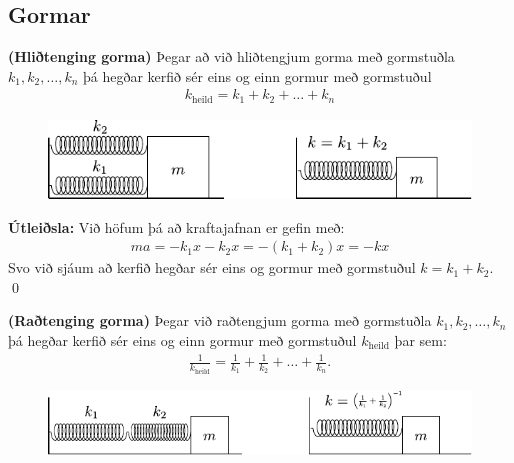 \subsection*{Gormar}

\begin{tcolorbox}
\begin{theorem}
\textbf{(Hliðtenging gorma)} Þegar að við hliðtengjum gorma með gormstuðla $k_1,k_2, \ldots, k_n$ þá hegðar kerfið sér eins og einn gormur með gormstuðul
\begin{align*}
    k_{\text{heild}} = k_1 + k_2 + \ldots + k_n
\end{align*}
\end{theorem}
\begin{figure}[H]
    \centering
    \includegraphics{figures/hlidtenging-gormar.pdf}
\end{figure}
\end{tcolorbox}

\textbf{Útleiðsla:} Við höfum þá að kraftajafnan er gefin með:
\begin{align*}
    ma = -k_1x - k_2 x = -(k_1+k_2)x = -kx
\end{align*}
Svo við sjáum að kerfið hegðar sér eins og gormur með gormstuðul $k = k_1 + k_2$. \qed

\begin{tcolorbox}
\begin{theorem}
\textbf{(Raðtenging gorma)} Þegar við raðtengjum gorma með gormstuðla $k_1, k_2, \ldots, k_n$ þá hegðar kerfið sér eins og einn gormur með gormstuðul $k_{\text{heild}}$ þar sem:
\begin{align*}
    \frac{1}{k_{\text{heild}}} = \frac{1}{k_1} + \frac{1}{k_2} + \ldots + \frac{1}{k_n}.
\end{align*}
\end{theorem}
\begin{figure}[H]
    \centering
    \includegraphics{figures/radtengdir-gormar.pdf}
\end{figure}
\end{tcolorbox}

